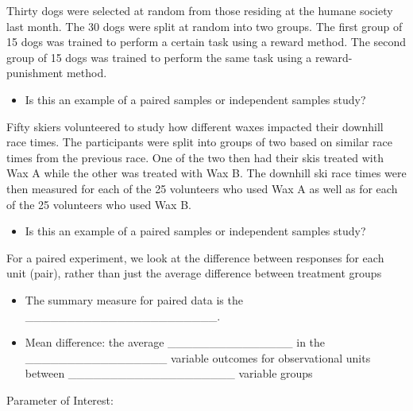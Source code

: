 \documentclass[
]{report}
\providecommand{\tightlist}{%
  \setlength{\itemsep}{0pt}\setlength{\parskip}{0pt}}
\begin{document}
\vspace{0.2in}

Thirty dogs were selected at random from those residing at the humane society last month. The 30 dogs were split at random into two groups. The first group of 15 dogs was trained to perform a certain task using a reward method. The second group of 15 dogs was trained to perform the same task using a reward-punishment method.

\begin{itemize}
\tightlist
\item
  Is this an example of a paired samples or independent samples study?
\end{itemize}

\vspace{0.2in}

Fifty skiers volunteered to study how different waxes impacted their downhill race times. The participants were split into groups of two based on similar race times from the previous race. One of the two then had their skis treated with Wax A while the other was treated with Wax B. The downhill ski race times were then measured for each of the 25 volunteers who used Wax A as well as for each of the 25 volunteers who used Wax B.

\begin{itemize}
\tightlist
\item
  Is this an example of a paired samples or independent samples study?
\end{itemize}

\vspace{0.2in}

For a paired experiment, we look at the difference between responses for each unit (pair), rather than just the average difference between treatment groups


\begin{itemize}
\item
  The summary measure for paired data is the \_\_\_\_\_\_\_\_\_\_\_\_\_\_\_\_\_\_\_\_\_\_\_.
\item
  Mean difference: the average \_\_\_\_\_\_\_\_\_\_\_\_\_\_\_ in the \_\_\_\_\_\_\_\_\_\_\_\_\_\_\_\_\_
  variable outcomes for observational units between \_\_\_\_\_\_\_\_\_\_\_\_\_\_\_\_\_\_\_\_ variable groups
\end{itemize}


Parameter of Interest:
\end{document}

